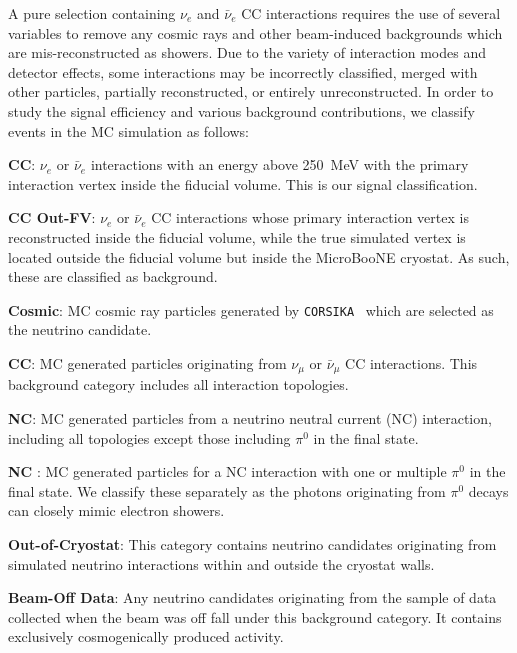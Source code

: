 A pure selection containing $\nu_e$ and $\bar{\nu}_e$ CC interactions requires the use of several variables to remove any cosmic rays and other beam-induced backgrounds which are mis-reconstructed as showers. Due to the variety of interaction modes and detector effects, some interactions may be incorrectly classified, merged with other particles, partially reconstructed, or entirely unreconstructed. In order to study the signal efficiency and various background contributions, we classify events in the MC simulation as follows:

 \textbf{CC}: $\nu_e$ or $\bar{\nu}_e$ interactions with an energy above 250~MeV with the primary interaction vertex inside the fiducial volume. This is our signal classification.

 \textbf{CC Out-FV}: $\nu_e$ or $\bar{\nu}_e$ CC interactions whose primary interaction vertex is reconstructed inside the fiducial volume, while the true simulated vertex is located outside the fiducial volume but inside the MicroBooNE cryostat. As such, these are classified as background.

\textbf{Cosmic}: MC cosmic ray particles generated by \texttt{CORSIKA}~\cite{corsika} which are selected as the neutrino candidate. %

\boldsymbol{$\nu_{\mu}$} \textbf{CC}: MC generated particles originating from $\nu_{\mu}$ or $\bar{\nu}_{\mu}$ CC interactions. This background category includes all interaction topologies.

\textbf{NC}: MC generated particles from a neutrino neutral current (NC) interaction, including all topologies except those including $\pi^{0}$ in the final state.

\textbf{NC} : MC generated particles for a NC interaction with one or multiple $\pi^{0}$ in the final state. We classify these separately as the photons originating from $\pi^{0}$ decays can closely mimic electron showers.

\textbf{Out-of-Cryostat}: This category contains neutrino candidates originating from simulated neutrino interactions within and outside the cryostat walls.

\textbf{Beam-Off Data}: Any neutrino candidates originating from the sample of data collected when the beam was off fall under this background category. It contains exclusively cosmogenically produced activity.

